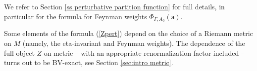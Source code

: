 \documentclass[11pt,a4paper]{amsart}
\theoremstyle{plain} %
\theoremstyle{definition}
\theoremstyle{remark}
\newcommand{\g}{\mathfrak{g}}
\newcommand{\mr}{\mathrm}
\newcommand{\sfa}{\mathsf{a}}
\newcommand{\ra}{\rightarrow}
\begin{document}
\begin{itemize}

\end{itemize}
We refer to Section \ref{ss perturbative partition function} for full details, in particular for the formula for Feynman weights $\Phi_{\Gamma,A_0}(\sfa)$.

Some elements of the formula (\ref{Zpert}) depend on the choice of a Riemann metric on $M$ (namely, the eta-invariant and Feynman weights). The dependence of the full object $Z$ on metric -- 
with an appropriate renormalization factor included
-- turns out to be BV-exact, see Section \ref{sec:intro metric}.
\end{document}
